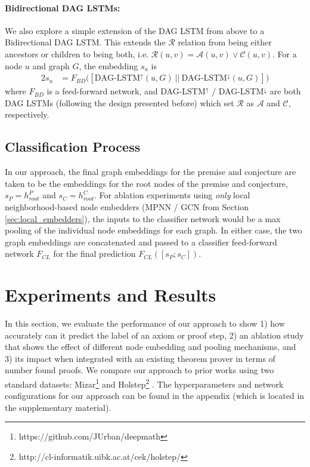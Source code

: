 \documentclass{article}
\begin{document}
\paragraph{Bidirectional DAG LSTMs:} We also explore a simple extension of the DAG LSTM from above to a Bidirectional DAG LSTM. This extends the $\mathcal{R}$ relation from being either ancestors or children to being both, i.e. $\mathcal{R}(u, v) = \mathcal{A}(u, v) \vee \mathcal{C}(u, v)$. For a node $u$ and graph $G$, the embedding $s_u$ is
\begin{alignat*}{2}
s_u &= F_{BD}\big( [ \textrm{DAG-LSTM}^{\uparrow}(u, G) \ || \ \textrm{DAG-LSTM}^{\downarrow}(u, G)] \big)
\end{alignat*}
where $F_{BD}$ is a feed-forward network, and DAG-LSTM$^{\uparrow}$ / DAG-LSTM$^{\downarrow}$ are both DAG LSTMs (following the design presented before) which set $\mathcal{R}$ as $\mathcal{A}$ and $\mathcal{C}$, respectively.

\subsection{Classification Process}

In our approach, the final graph embeddings for the premise and conjecture are taken to be the embeddings for the root nodes of the premise and conjecture, $s_P = h^{P}_{root}$ and $s_C = h^{C}_{root}$. For ablation experiments using \textit{only} local neighborhood-based node embedders (MPNN / GCN from Section \ref{sec:local_embedders}), the inputs to the classifier network would be a max pooling of the individual node embeddings for each graph. In either case,
the two graph embeddings are concatenated and passed to a classifier feed-forward network $F_{CL}$ for the final prediction $F_{CL}([s_P ; s_C])$.
 
\section{Experiments and Results}
In this section, we evaluate the performance of our approach to show 1) how accurately can it predict the label of an axiom or proof step, 2) an ablation study that shows the effect of different node embedding and pooling mechanisms, and 3) its impact when integrated with an existing theorem prover in terms of number found proofs. We compare our approach to prior works using two standard datasets: Mizar\footnote{https://github.com/JUrban/deepmath} \cite{mizar40for40} and Holstep\footnote{http://cl-informatik.uibk.ac.at/cek/holstep/} \cite{kaliszyk2017holstep}. The hyperparameters and network configurations for our approach can be found in the appendix (which is located in the supplementary material).
\end{document}

